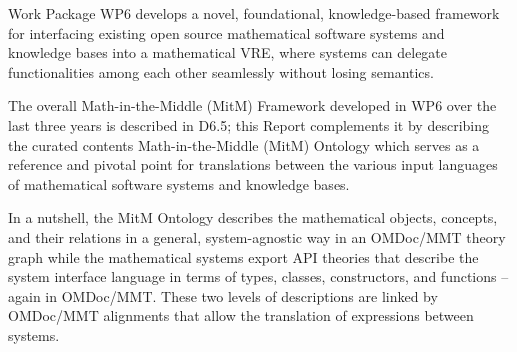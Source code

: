   Work Package WP6 develops a novel, foundational, knowledge-based framework for
  interfacing existing open source mathematical software systems and knowledge bases into
  a mathematical VRE, where systems can delegate functionalities among each other
  seamlessly without losing semantics.

  The overall Math-in-the-Middle (MitM) Framework developed in WP6 over the last three
  years is described in D6.5; this Report complements it by describing the curated
  contents Math-in-the-Middle (MitM) Ontology which serves as a reference and pivotal
  point for translations between the various input languages of mathematical software
  systems and knowledge bases.

  In a nutshell, the MitM Ontology describes the mathematical objects, concepts, and their
  relations in a general, system-agnostic way in an OMDoc/MMT theory graph while the
  mathematical systems export API theories that describe the system interface language in
  terms of types, classes, constructors, and functions -- again in OMDoc/MMT. These two
  levels of descriptions are linked by OMDoc/MMT alignments that allow the translation of
  expressions between systems.

